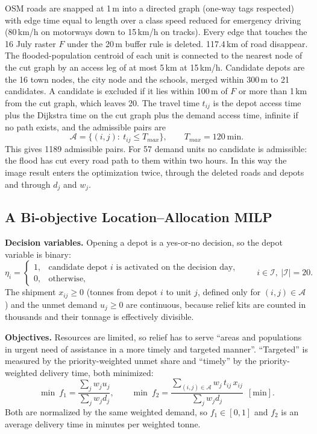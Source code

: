 OSM roads are snapped at 1\,m into a directed graph (one-way tags respected) with edge time equal to length over a class speed reduced for emergency driving (80\,km/h on motorways down to 15\,km/h on tracks). Every edge that touches the 16 July raster $F$ under the 20\,m buffer rule is deleted. 117.4\,km of road disappear. The flooded-population centroid of each unit is connected to the nearest node of the cut graph by an access leg of at most 5\,km at 15\,km/h. Candidate depots are the 16 town nodes, the city node and the schools, merged within 300\,m to 21 candidates. A candidate is excluded if it lies within 100\,m of $F$ or more than 1\,km from the cut graph, which leaves 20. The travel time $t_{ij}$ is the depot access time plus the Dijkstra time on the cut graph plus the demand access time, infinite if no path exists, and the admissible pairs are
\begin{equation}
\mathcal A=\{(i,j):\ t_{ij}\le T_{max}\},\qquad T_{max}=120\ \mathrm{min}.
\label{eq:admissible}
\end{equation}
This gives 1189 admissible pairs. For 57 demand units no candidate is admissible: the flood has cut every road path to them within two hours. In this way the image result enters the optimization twice, through the deleted roads and depots and through $d_j$ and $w_j$.

\subsection{A Bi-objective Location--Allocation MILP}

\textbf{Decision variables.} Opening a depot is a yes-or-no decision, so the depot variable is binary:
\begin{equation}
\eta_i=\begin{cases}1, & \text{candidate depot } i \text{ is activated on the decision day},\\ 0, & \text{otherwise},\end{cases}\qquad i\in\mathcal I,\ |\mathcal I|=20 .
\label{eq:eta}
\end{equation}
The shipment $x_{ij}\ge0$ (tonnes from depot $i$ to unit $j$, defined only for $(i,j)\in\mathcal A$) and the unmet demand $u_j\ge0$ are continuous, because relief kits are counted in thousands and their tonnage is effectively divisible.

\textbf{Objectives.} Resources are limited, so relief has to serve ``areas and populations in urgent need of assistance in a more timely and targeted manner''. ``Targeted'' is measured by the priority-weighted unmet share and ``timely'' by the priority-weighted delivery time, both minimized:
\begin{equation}
\min\ f_1=\frac{\sum_jw_ju_j}{\sum_jw_jd_j},\qquad
\min\ f_2=\frac{\sum_{(i,j)\in\mathcal A}w_j\,t_{ij}\,x_{ij}}{\sum_jw_jd_j}\ \ [\mathrm{min}].
\label{eq:q5_obj}
\end{equation}
Both are normalized by the same weighted demand, so $f_1\in[0,1]$ and $f_2$ is an average delivery time in minutes per weighted tonne.

